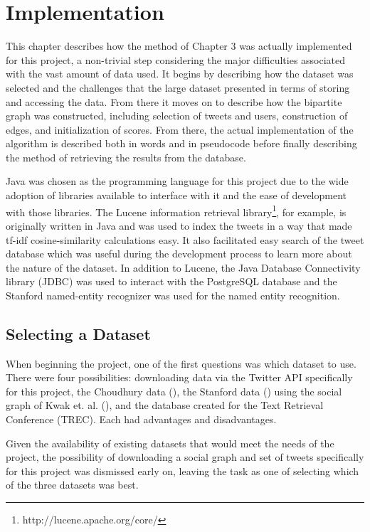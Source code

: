 \chapter{Implementation}

This chapter describes how the method of Chapter 3 was actually implemented for this project, a non-trivial step considering the major difficulties associated with the vast amount of data used. It begins by describing how the dataset was selected and the challenges that the large dataset presented in terms of storing and accessing the data. From there it moves on to describe how the bipartite graph was constructed, including selection of tweets and users, construction of edges,  and initialization of scores. From there, the actual implementation of the algorithm is described both in words and in pseudocode before finally describing the method of retrieving the results from the database.

Java was chosen as the programming language for this project due to the wide adoption of libraries available to interface with it and the ease of development with those libraries. The Lucene information retrieval library\footnote{http://lucene.apache.org/core/}, for example, is originally written in Java and was used to index the tweets in a way that made tf-idf cosine-similarity calculations easy. It also facilitated easy search of the tweet database which was useful during the development process to learn more about the nature of the dataset. In addition to Lucene, the Java Database Connectivity library (JDBC) was used to interact with the PostgreSQL database and the Stanford named-entity recognizer was used for the named entity recognition.

\section{Selecting a Dataset}
\label{sec:SelectingADataset}


When beginning the project, one of the first questions was which dataset to use. There were four possibilities: downloading data via the Twitter API specifically for this project, the Choudhury data (\cite{Choudhury2010}), the Stanford data (\cite{Yang2011}) using the social graph of Kwak et. al. (\cite{Kwak2010}), and the database created for the Text Retrieval Conference (TREC). Each had advantages and disadvantages.

Given the availability of existing datasets that would meet the needs of the project, the possibility of downloading a social graph and set of tweets specifically for this project was dismissed early on, leaving the task as one of selecting which of the three datasets was best.

